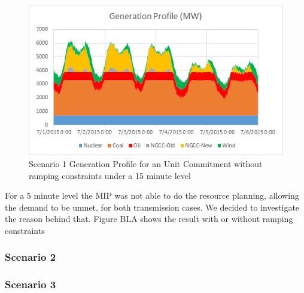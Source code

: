 \documentclass[12pt,LUDisStyle,twosided]{book}
\begin{document}
\begin{figure}[h] 
	\begin{center}
		\includegraphics[keepaspectratio]{PowerOutput_15_UC_TY_NoRamping.png}
	  	\caption{Scenario 1 Generation Profile for an Unit Commitment without ramping constraints under a 15 minute level}
     	\label{fig:noRampingConstraint}
	\end{center}
\end{figure}


For a 5 minute level the MIP was not able to do the resource planning,  allowing the demand to be unmet, for both transmission cases. We decided to investigate the reason behind that. Figure BLA shows the result with or without ramping constraints





\subsubsection{Scenario 2}

\subsubsection{Scenario 3}
\end{document}
